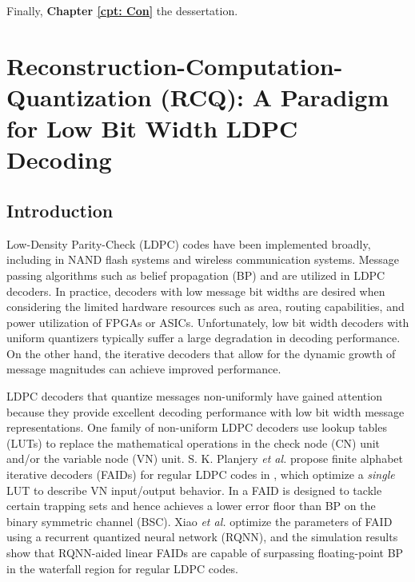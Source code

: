 \documentclass [PhD] {uclathes}
\begin{document}
Finally, \textbf{Chapter \ref{cpt: Con}} the dessertation.








\chapter{Reconstruction-Computation-Quantization (RCQ): A Paradigm for Low Bit Width LDPC Decoding}\label{cpt: rcq}


\section{Introduction}
Low-Density Parity-Check  (LDPC) codes \cite{GallagerPhD1963} have been implemented broadly, including in NAND flash systems and wireless communication systems. Message passing algorithms such as belief propagation (BP) and \minsum are utilized in LDPC decoders. In practice, decoders with low message bit widths are desired when considering the limited hardware resources such as area, routing capabilities, and power utilization of FPGAs or ASICs. Unfortunately, low bit width decoders with uniform quantizers typically suffer a large degradation in decoding performance\cite{-_Lee2005-MIMQBP}. On the other hand, the iterative decoders that allow for the dynamic growth of message magnitudes can achieve improved performance\cite{Zhang2014-ib}.




LDPC decoders that quantize messages  non-uniformly have gained attention because they provide excellent decoding performance with low bit width message representations. 
One family of non-uniform LDPC decoders use lookup tables (LUTs) to replace the mathematical operations in the check node (CN) unit  and/or the variable node (VN) unit. 
S. K. Planjery \emph{et al.} propose finite alphabet iterative decoders (FAIDs) for regular LDPC codes in \cite{Planjery2013-FAIDI,Declercq2013-FAIDII},  which optimize a \textit{single} LUT to describe VN input/output behavior. In \cite{Planjery2013-FAIDI} a FAID is  designed to tackle certain trapping sets and hence achieves a lower error floor than BP on the binary symmetric channel (BSC).  Xiao \emph{et al.} optimize the parameters of FAID using a recurrent quantized neural network (RQNN)\cite{Xiao2019-RNNFIAD,Xiao2020-RNNFAID}, and the simulation results show that RQNN-aided linear FAIDs are capable of surpassing floating-point BP in the waterfall region for regular LDPC codes.
\end{document}
